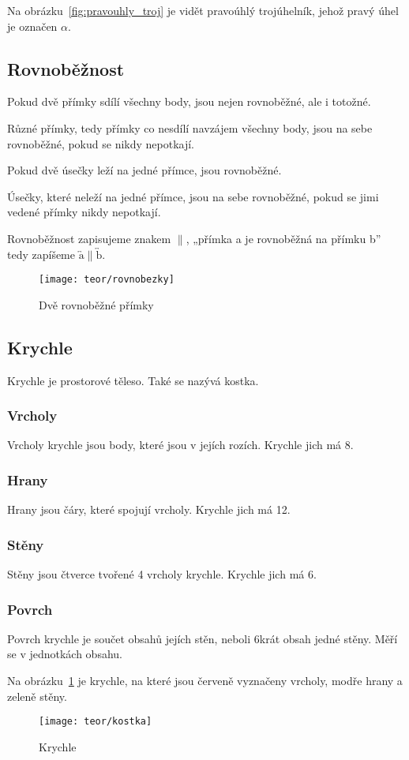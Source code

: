 Na obrázku~\ref{fig:pravouhly_troj} je vidět pravoúhlý trojúhelník, jehož pravý úhel je označen $\alpha$.

\subsection{Rovnoběžnost}
Pokud dvě přímky sdílí všechny body, jsou nejen rovnoběžné, ale i totožné.

Různé přímky, tedy přímky co nesdílí navzájem všechny body, jsou na sebe rovnoběžné, pokud se nikdy nepotkají.

Pokud dvě úsečky leží na jedné přímce, jsou rovnoběžné.

Úsečky, které neleží na jedné přímce, jsou na sebe rovnoběžné, pokud se jimi vedené přímky nikdy nepotkají.

Rovnoběžnost zapisujeme znakem $\|$, „přímka a je rovnoběžná na přímku b” tedy zapíšeme $\overleftrightarrow{\text{a}} \| \overleftrightarrow{\text{b}}$.
\begin{figure}[h]
    \centering
    \texttt{[image: teor/rovnobezky]}
    \caption{Dvě rovnoběžné přímky}
\end{figure}
\FloatBarrier

\subsection{Krychle}
Krychle je prostorové těleso. Také se nazývá kostka.

\subsubsection{Vrcholy}
Vrcholy krychle jsou body, které jsou v jejích rozích. Krychle jich má 8.

\subsubsection{Hrany}
Hrany jsou čáry, které spojují vrcholy. Krychle jich má 12.

\subsubsection{Stěny}
Stěny jsou čtverce tvořené 4 vrcholy krychle. Krychle jich má 6.

\subsubsection{Povrch}
Povrch krychle je součet obsahů jejích stěn, neboli 6krát obsah jedné stěny. Měří se v jednotkách obsahu.

Na obrázku~\ref{fig:krychle} je krychle, na které jsou červeně vyznačeny vrcholy, modře hrany a zeleně stěny.

\begin{figure}[h]
    \centering
    \texttt{[image: teor/kostka]}
    \caption{Krychle}
    \label{fig:krychle}
\end{figure}


